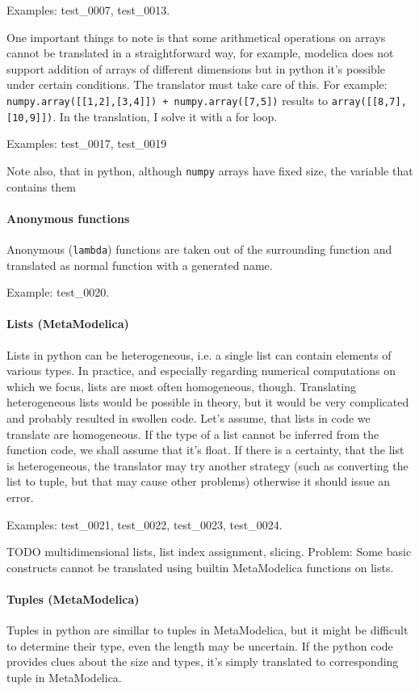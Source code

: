 \documentclass[a4paper,10pt]{article}
\begin{document}
Examples: test\_0007, test\_0013.

One important things to note is that some arithmetical operations on arrays cannot be translated in a straightforward 
way, for example, modelica does not support addition of arrays of different dimensions but in python it's possible
under certain conditions. The translator must take care of this. For example: {\tt numpy.array([[1,2],[3,4]]) + numpy.array([7,5])}
results to {\tt array([[8,7],[10,9]])}. In the translation, I solve it with a for loop. 

Examples: test\_0017, test\_0019

Note also, that in python, although {\tt numpy} arrays have fixed size, the variable that contains them 

\paragraph{Anonymous functions}
Anonymous ({\tt lambda}) functions are taken out of the surrounding function and translated as normal function with a generated name.

Example: test\_0020.

\paragraph{Lists (MetaModelica)} Lists in python can be heterogeneous, i.e. a single list can contain elements of various types.
In practice, and especially regarding numerical computations on which we focus, lists are most often homogeneous, though.
Translating heterogeneous lists would be possible in theory, but it would be very complicated and probably resulted in
swollen code. Let's assume, that lists in code we translate are homogeneous. If the type of a list cannot be inferred from
the function code, we shall assume that it's float. If there is a certainty, that the list is heterogeneous, the translator
may try another strategy (such as converting the list to tuple, but that may cause other problems) otherwise it should
issue an error.

Examples: test\_0021,  test\_0022,  test\_0023,  test\_0024.

TODO multidimensional lists, list index assignment, slicing. Problem: Some basic constructs cannot be translated using builtin MetaModelica
functions on lists.

\paragraph{Tuples (MetaModelica)} 
Tuples in python are simillar to tuples in MetaModelica, but it might be difficult to determine their type, even the length may
be uncertain. If the python code provides clues about the size and types, it's simply translated to corresponding tuple in MetaModelica.
\end{document}
